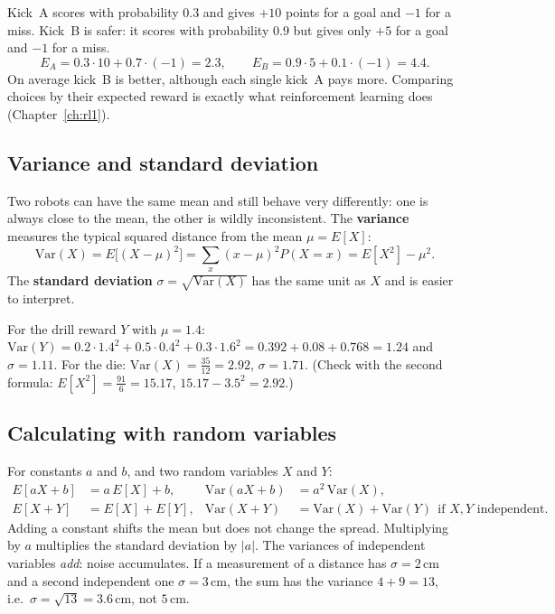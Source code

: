 \begin{example}
Kick~A scores with probability $0.3$ and gives $+10$ points for a goal and $-1$ for a miss. Kick~B is safer: it scores with probability $0.9$ but gives only $+5$ for a goal and $-1$ for a miss.
\[
E_A=0.3\cdot10+0.7\cdot(-1)=2.3,\qquad E_B=0.9\cdot5+0.1\cdot(-1)=4.4.
\]
On average kick~B is better, although each single kick~A pays more. Comparing choices by their expected reward is exactly what reinforcement learning does (Chapter~\ref{ch:rl1}).
\end{example}

\subsection*{Variance and standard deviation}
Two robots can have the same mean and still behave very differently: one is always close to the mean, the other is wildly inconsistent. The \textbf{variance} measures the typical squared distance from the mean $\mu=E[X]$:
\[
\mathrm{Var}(X)=E\bigl[(X-\mu)^2\bigr]=\sum_x (x-\mu)^2P(X=x)=E[X^2]-\mu^2.
\]
The \textbf{standard deviation} $\sigma=\sqrt{\mathrm{Var}(X)}$ has the same unit as $X$ and is easier to interpret.

For the drill reward $Y$ with $\mu=1.4$: $\mathrm{Var}(Y)=0.2\cdot1.4^2+0.5\cdot0.4^2+0.3\cdot1.6^2=0.392+0.08+0.768=1.24$ and $\sigma=1.11$. For the die: $\mathrm{Var}(X)=\frac{35}{12}=2.92$, $\sigma=1.71$. (Check with the second formula: $E[X^2]=\frac{91}{6}=15.17$, $15.17-3.5^2=2.92$.)

\subsection*{Calculating with random variables}
For constants $a$ and $b$, and two random variables $X$ and $Y$:
\begin{align*}
E[aX+b]&=a\,E[X]+b, & \mathrm{Var}(aX+b)&=a^2\,\mathrm{Var}(X),\\
E[X+Y]&=E[X]+E[Y], & \mathrm{Var}(X+Y)&=\mathrm{Var}(X)+\mathrm{Var}(Y)\ \ \text{if $X,Y$ independent.}
\end{align*}
Adding a constant shifts the mean but does not change the spread. Multiplying by $a$ multiplies the standard deviation by $|a|$. The variances of independent variables \emph{add}: noise accumulates. If a measurement of a distance has $\sigma=2$\,cm and a second independent one $\sigma=3$\,cm, the sum has the variance $4+9=13$, i.e.\ $\sigma=\sqrt{13}=3.6$\,cm, not $5$\,cm.

